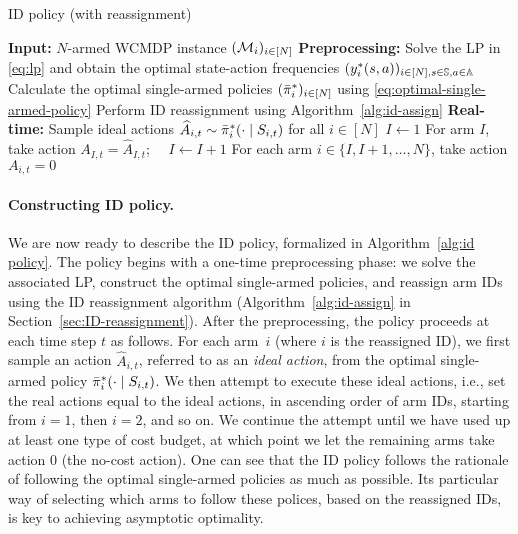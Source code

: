 \documentclass[11pt,letterpaper]{article}
\begin{document}
\begin{algorithm}[t]
    \caption{ID policy (with reassignment)}
    \label{alg:id policy}
    \begin{algorithmic}[1]
        \STATE
        \textbf{Input:} $N$-armed WCMDP instance $(\mathcal{M}_i)_{i\in[N]}$
        \STATE \textbf{Preprocessing:}        
        \STATE \hspace{0.7em} Solve the LP in \eqref{eq:lp} and obtain the optimal state-action frequencies $(y^*_i(s,a))_{i\in [N], s\in\mathbb{S},a\in\mathbb{A}}$
        \STATE \hspace{0.7em} Calculate the optimal single-armed policies $({\bar{\pi}}_i^*)_{i\in[N]}$ using \eqref{eq:optimal-single-armed-policy} 
        \STATE \hspace{0.7em} Perform ID reassignment using Algorithm~\ref{alg:id-assign}
        \STATE \textbf{Real-time:}
            \STATE Sample ideal actions $\widehat{A}_{i,t}\sim {\bar{\pi}}_i^*(\cdot\mid S_{i,t})$ for all $i\in[N]$
            \STATE $I\gets 1$ 
                \STATE For arm $I$, take action $A_{I,t}=\widehat{A}_{I,t}$; $\quad I\gets I+1$
            \ENDWHILE
        \STATE For each arm $i\in\{I,I+1,\dots,N\}$, take action $A_{i,t}=0$
        \ENDFOR
    \end{algorithmic}
\end{algorithm}
\paragraph{Constructing ID policy.}
We are now ready to describe the ID policy, formalized in Algorithm~\ref{alg:id policy}.
The policy begins with a one-time preprocessing phase: we solve the associated LP, construct the optimal single-armed policies, and reassign arm IDs using the ID reassignment algorithm (Algorithm~\ref{alg:id-assign} in Section~\ref{sec:ID-reassignment}).
After the preprocessing, the policy proceeds at each time step $t$ as follows.
For each arm~$i$ (where $i$ is the reassigned ID), we first sample an action $\widehat{A}_{i,t}$, referred to as an \emph{ideal action}, from the optimal single-armed policy ${\bar{\pi}}_i^*(\cdot \mid S_{i,t})$.
We then attempt to execute these ideal actions, i.e., set the real actions equal to the ideal actions, in ascending order of arm IDs, starting from $i=1$, then $i=2$, and so on.
We continue the attempt until we have used up at least one type of cost budget, at which point we let the remaining arms take action $0$ (the no-cost action).
One can see that the ID policy follows the rationale of following the optimal single-armed policies as much as possible.
Its particular way of selecting which arms to follow these polices, based on the reassigned IDs, is key to achieving asymptotic optimality.
\end{document}
